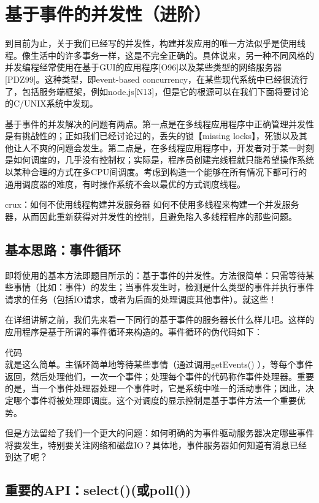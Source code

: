 \chapter{基于事件的并发性（进阶）}
\thispagestyle{empty}

到目前为止，关于我们已经写的并发性，构建并发应用的唯一方法似乎是使用线程。像生活中的许多事务一样，这是不完全正确的。具体说来，另一种不同风格的并发编程经常使用在基于GUI的应用程序[O96]以及某些类型的网络服务器[PDZ99]。这种类型，即event-based concurrency，在某些现代系统中已经很流行了，包括服务端框架，例如node.js[N13]，但是它的根源可以在我们下面将要讨论的C/UNIX系统中发现。

基于事件的并发解决的问题有两点。第一点是在多线程应用程序中正确管理并发性是有挑战性的；正如我们已经讨论过的，丢失的锁【missing locks】，死锁以及其他让人不爽的问题会发生。第二点是，在多线程应用程序中，开发者对于某一时刻是如何调度的，几乎没有控制权；实际是，程序员创建完线程就只能希望操作系统以某种合理的方式在多CPU间调度。考虑到构造一个能够在所有情况下都可行的通用调度器的难度，有时操作系统不会以最优的方式调度线程。

crux：如何不使用线程构建并发服务器
如何不使用多线程来构建一个并发服务器，从而因此重新获得对并发性的控制，且避免陷入多线程程序的那些问题。

\section{基本思路：事件循环}

即将使用的基本方法即题目所示的：基于事件的并发性。方法很简单：只需等待某些事情（比如：事件）的发生；当事件发生时，检测是什么类型的事件并执行事件请求的任务（包括IO请求，或者为后面的处理调度其他事件）。就这些！

在详细讲解之前，我们先来看一下同行的基于事件的服务器长什么样儿吧。这样的应用程序是基于所谓的事件循环来构造的。事件循环的伪代码如下：

代码\\

就是这么简单。主循环简单地等待某些事情（通过调用getEvents() ），等每个事件返回，然后处理他们，一次一个事件；处理每个事件的代码称作事件处理器。重要的是，当一个事件处理器处理一个事件时，它是系统中唯一的活动事件；因此，决定哪个事件将被处理即调度。这个对调度的显示控制是基于事件方法一个重要优势。

但是方法留给了我们一个更大的问题：如何明确的为事件驱动服务器决定哪些事件将要发生，特别要关注网络和磁盘IO？具体地，事件服务器如何知道有消息已经到达了呢？

\section{重要的API：select()(或poll())}

